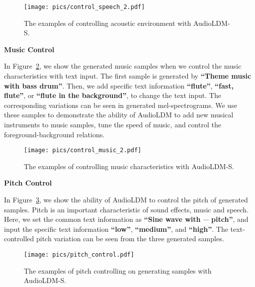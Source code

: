 \begin{figure}[H]
    \centering
    \texttt{[image: pics/control\_speech\_2.pdf]}
    \caption{The examples of controlling acoustic environment with AudioLDM-S.}
    \label{fig:demo-control-speech}
\end{figure}

\newpage

\textbf{Music Control}

In Figure~\ref{fig:demo-control-music}, we show the generated music samples when we control the music characteristics with text input. The first sample is generated by \textbf{``Theme music with bass drum''}. Then, we add specific text information \textbf{``flute''}, \textbf{``fast, flute''}, or \textbf{``flute in the background''}, to change the text input. The corresponding variations can be seen in generated mel-spectrograms. We use these samples to demonstrate the ability of AudioLDM to add new musical instruments to music samples, tune the speed of music, and control the foreground-background relations. 

\vspace{0.8cm}

\begin{figure}[H]
    \centering
    \texttt{[image: pics/control\_music\_2.pdf]}
    \caption{The examples of controlling music characteristics with AudioLDM-S.}
    \label{fig:demo-control-music}
\vspace{0.5cm}
\end{figure}

\newpage    

\textbf{Pitch Control}

In Figure~\ref{fig:pitch}, we show the ability of AudioLDM to control the pitch of generated samples. Pitch is an important characteristic of sound effects, music and speech. Here, we set the common text information as \textbf{``Sine wave with $\cdots$ pitch''}, and input the specific text information \textbf{``low''}, \textbf{``medium''}, and \textbf{``high''}. The text-controlled pitch variation can be seen from the three generated samples.

\vspace{0.5cm}

\begin{figure}[H]
    \centering
    \texttt{[image: pics/pitch\_control.pdf]}
    \caption{The examples of pitch controlling on generating samples with AudioLDM-S.}
    \label{fig:pitch}
\end{figure}

